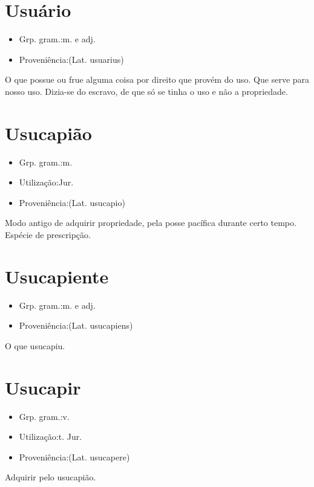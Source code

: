 \documentclass{article}
\begin{document}
\section{Usuário}
\begin{itemize}
\item {Grp. gram.:m.  e  adj.}
\end{itemize}
\begin{itemize}
\item {Proveniência:(Lat. \textunderscore usuarius\textunderscore )}
\end{itemize}
O que possue ou frue alguma coisa por direito que provém do uso.
Que serve para nosso uso.
Dizia-se do escravo, de que só se tinha o uso e não a propriedade.
\section{Usucapião}
\begin{itemize}
\item {Grp. gram.:m.}
\end{itemize}
\begin{itemize}
\item {Utilização:Jur.}
\end{itemize}
\begin{itemize}
\item {Proveniência:(Lat. \textunderscore usucapio\textunderscore )}
\end{itemize}
Modo antigo de adquirir propriedade, pela posse pacífica durante certo tempo.
Espécie de prescripção.
\section{Usucapiente}
\begin{itemize}
\item {Grp. gram.:m.  e  adj.}
\end{itemize}
\begin{itemize}
\item {Proveniência:(Lat. \textunderscore usucapiens\textunderscore )}
\end{itemize}
O que usucapiu.
\section{Usucapir}
\begin{itemize}
\item {Grp. gram.:v.}
\end{itemize}
\begin{itemize}
\item {Utilização:t. Jur.}
\end{itemize}
\begin{itemize}
\item {Proveniência:(Lat. \textunderscore usucapere\textunderscore )}
\end{itemize}
Adquirir pelo usucapião.
\end{document}
